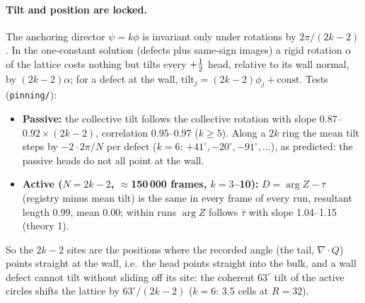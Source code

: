 \paragraph{Tilt and position are locked.} The anchoring director $\psi=k\phi$ is invariant only under rotations by $2\pi/(2k-2)$. In the one-constant
solution (defects plus same-sign images) a rigid rotation $\alpha$ of the lattice costs nothing but tilts every $+\tfrac12$ head, relative to its wall
normal, by $(2k-2)\alpha$; for a defect at the wall, $\text{tilt}_j=(2k-2)\phi_j+\text{const}$. Tests (\texttt{pinning/}):
\begin{itemize}
  \item \textbf{Passive:} the collective tilt follows the collective rotation with slope $0.87$--$0.92\times(2k-2)$, correlation 0.95--0.97
        ($k\ge5$). Along a $2k$ ring the mean tilt steps by $-2\cdot2\pi/N$ per defect ($k=6$: $+41^\circ,-20^\circ,-91^\circ,\dots$), as predicted:
        the passive heads do not all point at the wall.
  \item \textbf{Active ($N=2k-2$, $\approx$150\,000 frames, $k=3$--10):} $D=\arg Z-\bar\tau$ (registry minus mean tilt) is the same in every frame of
        every run, resultant length 0.99, mean 0.00; within runs $\arg Z$ follows $\bar\tau$ with slope 1.04--1.15 (theory 1).
\end{itemize}
So the $2k-2$ sites are the positions where the recorded angle (the tail, $\nabla\!\cdot Q$) points straight at the wall, i.e.\ the head points straight into the bulk, and a wall defect cannot tilt without sliding off its site:
the coherent $63^\circ$ tilt of the active circles shifts the lattice by $63^\circ/(2k-2)$ ($k=6$: 3.5 cells at $R=32$).

